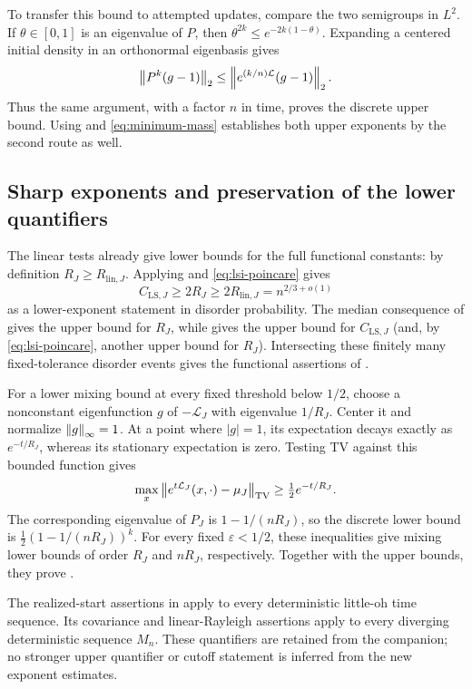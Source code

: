 To transfer this bound to attempted updates, compare the two
semigroups in $L^2$. If $\theta\in[0,1]$ is an eigenvalue of $P$, then
$\theta^{2k}\le e^{-2k(1-\theta)}$. Expanding a centered initial
density in an orthonormal eigenbasis gives
\begin{equation}\label{eq:discrete-l2-comparison}
 \left\lVert P^k(g-1)\right\rVert_2
 \le\left\lVert e^{(k/n)\mathcal L}(g-1)\right\rVert_2.
\end{equation}
Thus the same argument, with a factor $n$ in time, proves the discrete
upper bound. Using  and \eqref{eq:minimum-mass}
establishes both upper exponents by the second route as well.

\subsection{Sharp exponents and preservation of the lower quantifiers}

The linear tests already give lower bounds for the full functional
constants: by definition $R_J\ge R_{\mathrm{lin},J}$.
Applying  and \eqref{eq:lsi-poincare} gives
\[
 C_{\mathrm{LS},J}\ge2R_J\ge2R_{\mathrm{lin},J}
                  =n^{2/3+o(1)}
\]
as a lower-exponent statement in disorder probability. The median
consequence of  gives the upper bound for
$R_J$, while  gives the upper bound for
$C_{\mathrm{LS},J}$ (and, by \eqref{eq:lsi-poincare}, another upper bound
for $R_J$). Intersecting these finitely many fixed-tolerance disorder
events gives the functional assertions of .

For a lower mixing bound at every fixed threshold below $1/2$,
choose a nonconstant eigenfunction $g$ of $-\mathcal L_J$ with
eigenvalue $1/R_J$. Center it and normalize $\left\lVert g\right\rVert_\infty=1$.
At a point where $|g|=1$, its expectation decays exactly as
$e^{-t/R_J}$, whereas its stationary expectation is zero. Testing TV
against this bounded function gives
\[
 \max_x\left\lVert e^{t\mathcal L_J}(x,\cdot)-\mu_J\right\rVert_{\mathrm{TV}}
 \ge\tfrac12 e^{-t/R_J}.
\]
The corresponding eigenvalue of $P_J$ is $1-1/(nR_J)$, so the discrete
lower bound is $\tfrac12(1-1/(nR_J))^k$.
For every fixed $\varepsilon<1/2$, these inequalities give mixing
lower bounds of order $R_J$ and $nR_J$, respectively. Together with
the upper bounds, they prove .

The realized-start assertions in  apply to
every deterministic little-oh time sequence. Its covariance and
linear-Rayleigh assertions apply to every diverging deterministic
sequence $M_n$. These quantifiers are retained from the companion;
no stronger upper quantifier or cutoff statement is inferred from
the new exponent estimates.

